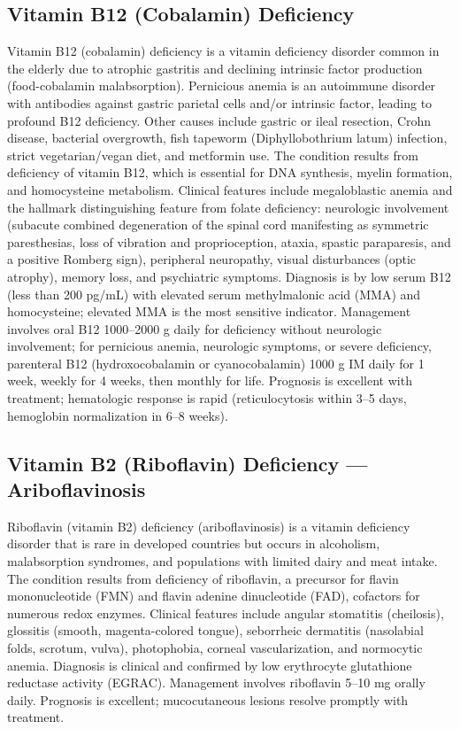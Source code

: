 \subsection{Vitamin B12 (Cobalamin) Deficiency}
\label{sec:Vitamin B12 Deficiency}
Vitamin B12 (cobalamin) deficiency is a vitamin deficiency disorder common in the elderly due to atrophic gastritis and declining intrinsic factor production (food-cobalamin malabsorption). Pernicious anemia is an autoimmune disorder with antibodies against gastric parietal cells and/or intrinsic factor, leading to profound B12 deficiency. Other causes include gastric or ileal resection, Crohn disease, bacterial overgrowth, fish tapeworm (Diphyllobothrium latum) infection, strict vegetarian/vegan diet, and metformin use. The condition results from deficiency of vitamin B12, which is essential for DNA synthesis, myelin formation, and homocysteine metabolism. Clinical features include megaloblastic anemia and the hallmark distinguishing feature from folate deficiency: neurologic involvement (subacute combined degeneration of the spinal cord manifesting as symmetric paresthesias, loss of vibration and proprioception, ataxia, spastic paraparesis, and a positive Romberg sign), peripheral neuropathy, visual disturbances (optic atrophy), memory loss, and psychiatric symptoms. Diagnosis is by low serum B12 (less than 200 pg/mL) with elevated serum methylmalonic acid (MMA) and homocysteine; elevated MMA is the most sensitive indicator. Management involves oral B12 1000--2000 \textmu g daily for deficiency without neurologic involvement; for pernicious anemia, neurologic symptoms, or severe deficiency, parenteral B12 (hydroxocobalamin or cyanocobalamin) 1000 \textmu g IM daily for 1 week, weekly for 4 weeks, then monthly for life. Prognosis is excellent with treatment; hematologic response is rapid (reticulocytosis within 3--5 days, hemoglobin normalization in 6--8 weeks).

\subsection{Vitamin B2 (Riboflavin) Deficiency --- Ariboflavinosis}
\label{sec:Vitamin B2 Deficiency}
Riboflavin (vitamin B2) deficiency (ariboflavinosis) is a vitamin deficiency disorder that is rare in developed countries but occurs in alcoholism, malabsorption syndromes, and populations with limited dairy and meat intake. The condition results from deficiency of riboflavin, a precursor for flavin mononucleotide (FMN) and flavin adenine dinucleotide (FAD), cofactors for numerous redox enzymes. Clinical features include angular stomatitis (cheilosis), glossitis (smooth, magenta-colored tongue), seborrheic dermatitis (nasolabial folds, scrotum, vulva), photophobia, corneal vascularization, and normocytic anemia. Diagnosis is clinical and confirmed by low erythrocyte glutathione reductase activity (EGRAC). Management involves riboflavin 5--10 mg orally daily. Prognosis is excellent; mucocutaneous lesions resolve promptly with treatment.

